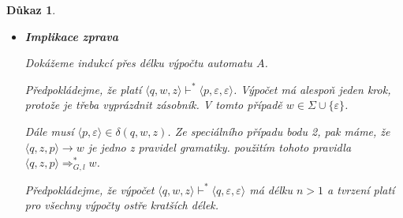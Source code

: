 \documentclass[10pt, a4paper, titlepage]{article}
\theoremstyle{note}
\newtheorem{dukaz}{Důkaz}
\begin{document}
\begin{dukaz}
\begin{itemize}
Rozepsáním $\langle q,z,p \rangle \Rightarrow_{G,l}^* w$ dostaneme, že $\langle q,z,p \rangle \Rightarrow_{G,l} a \langle r_0,z_1,r_1 \rangle \cdots \langle r_{k-1},z_k,r_k \rangle \Rightarrow_{G,l}^* w$ kde $r_1,\ldots,r_k \in Q,\ r_k=p$ a $\langle q,z,p \rangle \rightarrow a \langle r_0,z_1,r_1 \rangle \cdots \langle r_{k-1},z_k,r_k \rangle$ je pravidlo dle bodu 2.

Dle bodu 2, musí platit, že $\langle r_0,z_1\cdots z_k \rangle \in \delta (p,x,z)$ a $w=a\cdot x$, kde $x \in \Sigma^*$ a $a \in \Sigma \cup \lbrace \varepsilon \rbrace$. Jelikož $\langle r_i,z_{i+1},r_{i+1} \rangle$ jsou všechno neterminály gramatiky.

Z vlastností bezkontextových gramatik platí, že $x$ lze vyjádřit jako $x=w_1w_2\cdots w_k$ tak, že $\langle r_{i-1},z_i,r_i \rangle \Rightarrow_{G,l}^* w_i$.

Každá z těchto nejlevějších derivací má délku nejvýše $n$. Na každou z nich aplikujeme indukční předpoklad, tj.: $\langle r_{i-1},w_i,z_i \rangle \vdash^* \langle r_i,\varepsilon,\varepsilon \rangle$.

Nyní můžeme zřetězit posloupnosti odpovídajících konfigurací:
\begin{eqnarray*}
\langle q,w,z \rangle &=& \langle q,ax,z \rangle \vdash \langle r_0,x,z_1z_2\cdots z_k \rangle \vdash^* \langle r_1,w_2 \cdots w_k,z_2 \cdots z_k \rangle \vdash^* \cdots \vdash^* \langle r_k,\varepsilon,\varepsilon \rangle \\
&=& \langle p, \varepsilon, \varepsilon \rangle
\end{eqnarray*}

což jsme měli dokázat.

\item
\textbf{Implikace zprava}

Dokážeme indukcí přes délku výpočtu automatu $A$.

Předpokládejme, že platí $\langle q,w,z \rangle \vdash^* \langle p, \varepsilon,\varepsilon \rangle$. Výpočet má alespoň jeden krok, protože je třeba vyprázdnit zásobník. V tomto případě $w \in \Sigma \cup \lbrace \varepsilon \rbrace$.

Dále musí $\langle p, \varepsilon \rangle \in \delta(q,w,z)$. Ze speciálního případu bodu 2, pak máme, že $\langle q,z,p \rangle \rightarrow w$ je jedno z pravidel gramatiky. použitím tohoto pravidla $\langle q,z,p \rangle \Rightarrow_{G,l}^* w$.

Předpokládejme, že výpočet $\langle q,w,z \rangle \vdash^* \langle q,\varepsilon , \varepsilon \rangle$ má délku $n>1$ a tvrzení platí pro všechny výpočty ostře kratších délek.


\end{itemize}
\end{dukaz}
\end{document}
